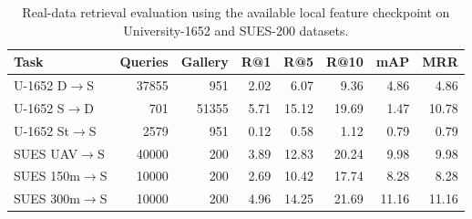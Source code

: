 \begin{table}[!t]
\centering
\caption{Real-data retrieval evaluation using the available local feature checkpoint on University-1652 and SUES-200 datasets.}
\label{tab:real_retrieval}
\begin{tabular}{lrrrrrrr}
\toprule
Task & Queries & Gallery & R@1 & R@5 & R@10 & mAP & MRR \\
\midrule
U-1652 D$\rightarrow$S & 37855 & 951 & 2.02 & 6.07 & 9.36 & 4.86 & 4.86 \\
U-1652 S$\rightarrow$D & 701 & 51355 & 5.71 & 15.12 & 19.69 & 1.47 & 10.78 \\
U-1652 St$\rightarrow$S & 2579 & 951 & 0.12 & 0.58 & 1.12 & 0.79 & 0.79 \\
SUES UAV$\rightarrow$S & 40000 & 200 & 3.89 & 12.83 & 20.24 & 9.98 & 9.98 \\
SUES 150m$\rightarrow$S & 10000 & 200 & 2.69 & 10.42 & 17.74 & 8.28 & 8.28 \\
SUES 300m$\rightarrow$S & 10000 & 200 & 4.96 & 14.25 & 21.69 & 11.16 & 11.16 \\
\bottomrule
\end{tabular}
\end{table}
